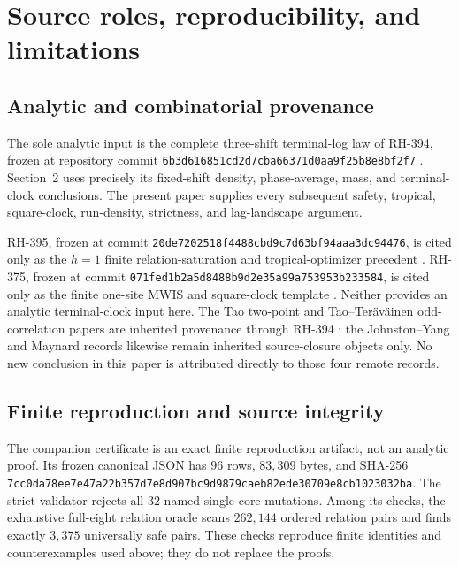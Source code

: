 \documentclass[11pt]{article}
\theoremstyle{definition}
\theoremstyle{remark}
\begin{document}
\section{Source roles, reproducibility, and limitations}

\subsection{Analytic and combinatorial provenance}

The sole analytic input is the complete three-shift terminal-log law of
RH-394, frozen at repository commit
\nolinkurl{6b3d616851cd2d7cba66371d0aa9f25b8e8bf2f7}
\cite{RH394}.  Section~2 uses precisely its fixed-shift density,
phase-average, mass, and terminal-clock conclusions.  The present paper
supplies every subsequent safety, tropical, square-clock, run-density,
strictness, and lag-landscape argument.

RH-395, frozen at commit
\nolinkurl{20de7202518f4488cbd9c7d63bf94aaa3dc94476}, is cited only as
the \(h=1\) finite relation-saturation and tropical-optimizer precedent
\cite{RH395}.  RH-375, frozen at commit
\nolinkurl{071fed1b2a5d8488b9d2e35a99a753953b233584}, is cited only as
the finite one-site MWIS and square-clock template \cite{RH375}.
Neither provides an analytic terminal-clock input here.  The
Tao two-point and Tao--Ter\"av\"ainen odd-correlation papers are
inherited provenance through RH-394 \cite{Tao2016LogChowla,
TaoTeravainen2019}; the Johnston--Yang and Maynard records likewise
remain inherited source-closure objects only.  No new conclusion in
this paper is attributed directly to those four remote records.

\subsection{Finite reproduction and source integrity}

The companion certificate is an exact finite reproduction artifact,
not an analytic proof.  Its frozen canonical JSON has \(96\) rows,
\(83{,}309\) bytes, and SHA-256
\nolinkurl{7cc0da78ee7e47a22b357d7e8d907bc9d9879caeb82ede30709e8cb1023032ba}.
The strict validator rejects all \(32\) named single-core mutations.
Among its checks, the exhaustive full-eight relation oracle scans
\(262{,}144\) ordered relation pairs and finds exactly \(3{,}375\)
universally safe pairs.  These checks reproduce finite identities and
counterexamples used above; they do not replace the proofs.
\end{document}
